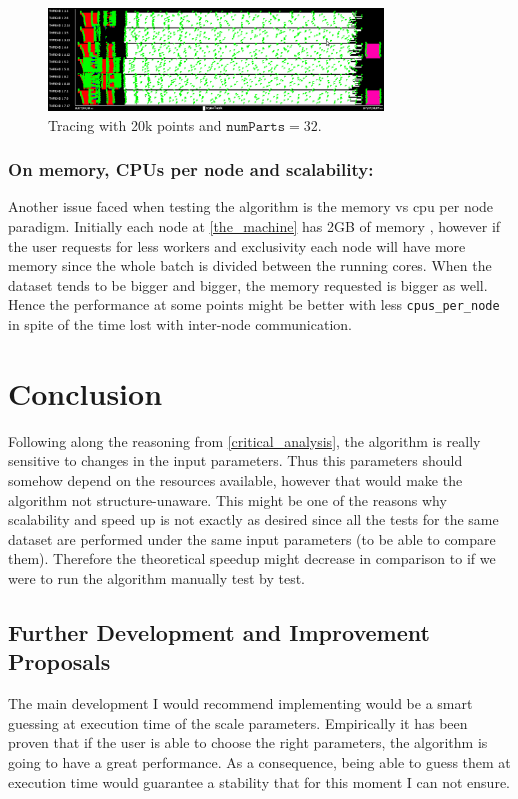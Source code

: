 \documentclass[10pt,journal,compsoc]{IEEEtran}
\let\MYoriglatexcaption\caption
\renewcommand{\caption}[2][\relax]{\MYoriglatexcaption[#2]{#2}}
\begin{document}
\begin{figure}[!h]
\centering
\includegraphics[width=3.5in]{img/traca_mes_caca.png}
\caption{Tracing with 20k points and $\texttt{numParts}=32$.}
\label{traca_caca}
\end{figure}

\subsubsection*{On memory, CPUs per node and scalability:} \label{q_coi_passa}

Another issue faced when testing the algorithm is the memory vs cpu per node paradigm. Initially each node at \ref{the_machine} has 2GB of memory , however if the user requests for less workers and exclusivity each node will have more memory since the whole batch is divided between the running cores. When the dataset tends to be bigger and bigger, the memory requested is bigger as well. Hence the performance at some points might be better with less \texttt{cpus\_per\_node} in spite of the time lost with inter-node communication. 

\section{Conclusion}

Following along the reasoning from \ref{critical_analysis}, the algorithm is really sensitive to changes in the input parameters. Thus this parameters should somehow depend on the resources available, however that would make the algorithm not structure-unaware. This might be one of the reasons why scalability and speed up is not exactly as desired since all the tests for the same dataset are performed under the same input parameters (to be able to compare them). Therefore the theoretical speedup might decrease in comparison to if we were to run the algorithm manually test by test.

\subsection{Further Development and Improvement Proposals} \label{further_development}
The main development I would recommend implementing would be a smart guessing at execution time of the scale parameters. Empirically it has been proven that if the user is able to choose the right parameters, the algorithm is going to have a great performance. As a consequence, being able to guess them at execution time would guarantee a stability that for this moment I can not ensure.
\end{document}
